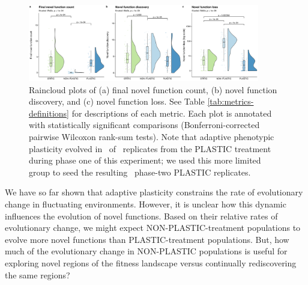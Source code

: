 \begin{raggedbottom}
\begin{figure}[h!]
  \centering
  \includegraphics[width=0.9\textwidth]{02_consequences_of_plasticity/media/media-complex-traits-magnitude-panel.pdf}
  \caption{\small
  Raincloud plots of
  (a) final novel function count,
  (b) novel function discovery,
  and (c) novel function loss.
  See Table \ref{tab:metrics-definitions} for descriptions of each metric.
  Each plot is annotated with statistically significant comparisons (Bonferroni-corrected pairwise Wilcoxon rank-sum tests).
  Note that adaptive phenotypic plasticity evolved in \novelTraitsPlasticReps\ of \novelTraitsReplicates\ replicates from the PLASTIC treatment during phase one of this experiment; we used this more limited group to seed the resulting \novelTraitsPlasticReps\ phase-two PLASTIC replicates.
  }
  \label{fig:complex-traits-magnitude}
\end{figure}

We have so far shown that adaptive plasticity constrains the rate of evolutionary change in fluctuating environments.
However, it is unclear how this dynamic influences the evolution of novel functions.
Based on their relative rates of evolutionary change, we might expect NON-PLASTIC-treatment populations to evolve more novel functions than PLASTIC-treatment populations.
But, how much of the evolutionary change in NON-PLASTIC populations is useful for exploring novel regions of the fitness landscape versus continually rediscovering the same regions?


\end{raggedbottom}
